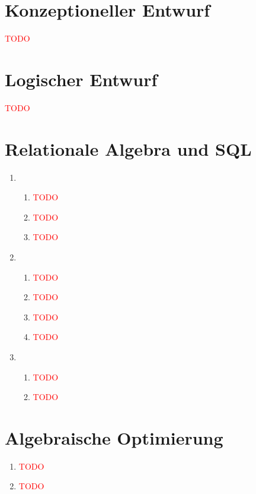 \documentclass[ngerman]{gdb-aufgabenblatt}
\begin{document}
\section{Konzeptioneller Entwurf}
\textcolor{red}{TODO}


\section{Logischer Entwurf}
\textcolor{red}{TODO}


\section{Relationale Algebra und SQL}

\begin{enumerate}
    \item 
        \begin{enumerate}
            \item 
                \textcolor{red}{TODO}
            \item 
                \textcolor{red}{TODO}
            \item 
                \textcolor{red}{TODO}
            
        \end{enumerate}
    \item 
        \begin{enumerate}
            \item 
                \textcolor{red}{TODO}
            \item
                \textcolor{red}{TODO}
            \item
                \textcolor{red}{TODO}
            \item
                \textcolor{red}{TODO}
                
        \end{enumerate}    

    \item 
        \begin{enumerate}
            \item 
                \textcolor{red}{TODO}
            \item
                \textcolor{red}{TODO}
                
        \end{enumerate}    

\end{enumerate}

\section{Algebraische Optimierung}

\begin{enumerate}
    \item
        \textcolor{red}{TODO}
    \item  
        \textcolor{red}{TODO}
        
\end{enumerate}
\end{document}
